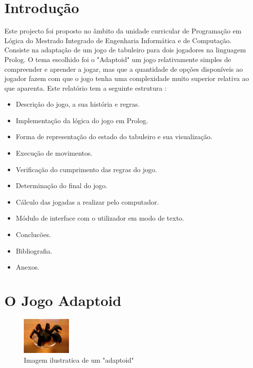 \documentclass[a4paper]{article}
\begin{document}

\newpage

\section{Introdução}

Este projecto foi proposto no âmbito da unidade curricular de Programação em Lógica do Mestrado Integrado de Engenharia Informática e de Computação. Consiste na adaptação de um jogo de tabuleiro para dois jogadores na linguagem Prolog. O tema escolhido foi o "Adaptoid" um jogo relativamente simples de compreender e aprender a jogar, mas que a quantidade de opções disponíveis ao jogador fazem com que o jogo tenha uma complexidade muito superior relativa ao que aparenta.
Este relatório tem a seguinte estrutura :
 \begin{itemize}
   \item Descrição do jogo, a sua história e regras.
   \item Implementação da lógica do jogo em Prolog.
   \item Forma de representação do estado do tabuleiro e sua visualização.
   \item Execução de movimentos.
   \item Verificação do cumprimento das regras do jogo.
   \item Determinação do final do jogo.
   \item Cálculo das jogadas a realizar pelo computador.
   \item Módulo de interface com o utilizador em modo de texto.
   \item Conclucões.
   \item Bibliografia.
   \item Anexos.
 \end{itemize}

\newpage
\section{O Jogo Adaptoid}

\begin{figure}
    \centering
    \includegraphics[width=0.22\textwidth]{adaptoid}
    \caption{Imagem ilustratica de um "adaptoid"}
\end{figure}
\end{document}

